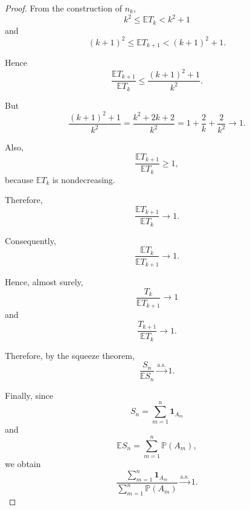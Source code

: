 \begin{proof}
From the construction of $n_k$,
\[
    k^2
    \leq
    \mathbb E T_k
    <
    k^2+1
\]
and
\[
    (k+1)^2
    \leq
    \mathbb E T_{k+1}
    <
    (k+1)^2+1.
\]

Hence
\[
    \frac{\mathbb E T_{k+1}}
         {\mathbb E T_k}
    \leq
    \frac{(k+1)^2+1}{k^2}.
\]

But
\[
    \frac{(k+1)^2+1}{k^2}
    =
    \frac{k^2+2k+2}{k^2}
    =
    1+\frac{2}{k}+\frac{2}{k^2}
    \longrightarrow1.
\]

Also,
\[
    \frac{\mathbb E T_{k+1}}
         {\mathbb E T_k}
    \geq1,
\]
because $\mathbb E T_k$ is nondecreasing.

Therefore,
\[
    \boxed{
    \frac{\mathbb E T_{k+1}}
         {\mathbb E T_k}
    \longrightarrow1.
    }
\]

Consequently,
\[
    \frac{\mathbb E T_k}
         {\mathbb E T_{k+1}}
    \longrightarrow1.
\]

Hence, almost surely,
\[
    \frac{T_k}{\mathbb E T_{k+1}}
    \longrightarrow1
\]
and
\[
    \frac{T_{k+1}}{\mathbb E T_k}
    \longrightarrow1.
\]

Therefore, by the squeeze theorem,
\[
    \boxed{
    \frac{S_n}{\mathbb E S_n}
    \xrightarrow{\mathrm{a.s.}}1.
    }
\]

Finally, since
\[
    S_n=\sum_{m=1}^{n}\mathbf{1}_{A_m}
\]
and
\[
    \mathbb E S_n
    =
    \sum_{m=1}^{n}\mathbb P(A_m),
\]
we obtain
\[
    \boxed{
    \frac{\displaystyle\sum_{m=1}^{n}\mathbf{1}_{A_m}}
         {\displaystyle\sum_{m=1}^{n}\mathbb P(A_m)}
    \xrightarrow{\mathrm{a.s.}}1.
    }
\]

\end{proof}


\lectureend
